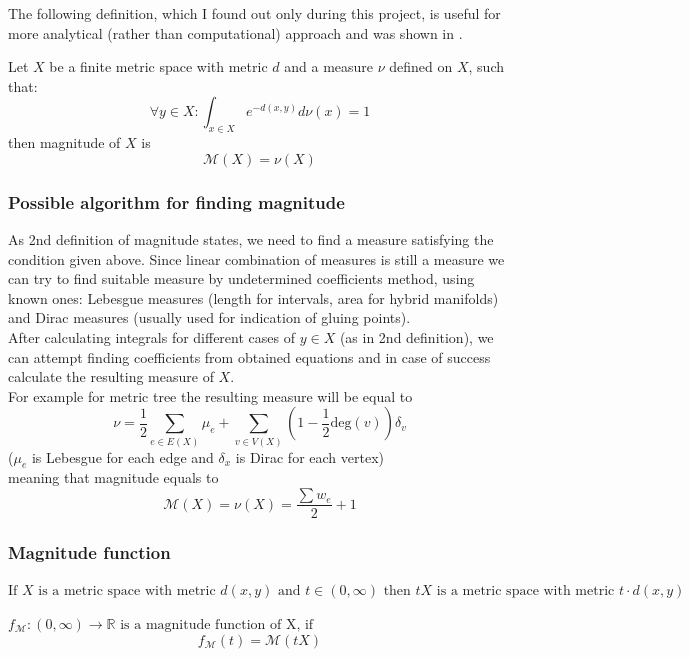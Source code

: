 \documentclass{article}
\begin{document}
The following definition, which I found out only during this project, is useful for
more analytical (rather than computational) approach and was shown in \textcite{Meckes_2012}. 

\begin{definition}
\item 
Let $X$ be a finite metric space with metric $d$ and a measure $\nu$ defined on $X$, such that:
    $$\forall y \in X : \int_{x \in X} e^{-d(x, y)} d \nu(x) = 1$$
then magnitude of $X$ is 
    $$\mathcal{M}(X) = \nu(X)$$
\item 
\end{definition}

\subsubsection{Possible algorithm for finding magnitude}

As 2nd definition of magnitude states, we need to find a measure satisfying the
condition given above. Since linear combination of measures is still a measure we
can try to find suitable measure by undetermined coefficients method, using known
ones: 
Lebesgue measures (length for intervals, area for hybrid manifolds) and Dirac
measures (usually used for indication of gluing points). 
\\

After calculating integrals for different cases of $y \in X$ (as in 2nd definition),
we can attempt finding coefficients from obtained equations and in case of success 
calculate the resulting measure of $X$. 
\\

For example for metric tree the resulting measure will be equal to
$$\nu = \frac{1}{2} \sum_{e \in E(X)} \mu_{e} + \sum_{v \in V(X)} (1 - \frac{1}{2} \text{deg}(v)) \delta_{v}$$ 
($\mu_e$ is Lebesgue for each edge and $\delta_x$ is Dirac for each vertex)
\\
meaning that magnitude equals to 
$$\mathcal{M}(X) = \nu(X) = \frac{\sum w_e}{2} + 1$$

\subsubsection{Magnitude function}
\begin{definition}
    $\text{If } X \text{ is a metric space with metric $d(x, y)$ and $t \in (0, \infty)$ then } tX \text{ is a metric space with metric } t \cdot d(x, y)$
\end{definition}
\begin{definition}
    $f_{\mathcal{M}} : (0, \infty) \rightarrow \mathbb{R} \text{ is a magnitude function of X, if }$
    $$f_{\mathcal{M}}(t) = \mathcal{M}(tX)$$
\end{definition}
\end{document}
